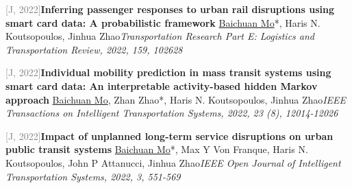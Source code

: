 \par\noindent\begin{minipage}{\linewidth}
{\textcolor{gray}{[J\themyCounter, 2022]\;}}{\textbf{Inferring passenger responses to urban rail disruptions using smart card data: A probabilistic framework} \href{https://doi.org/10.1016/j.tre.2022.102628}{\textcolor{cadmiumorange}{\faExternalLink}}}{\newline \underline{Baichuan Mo}*, Haris N. Koutsopoulos, Jinhua Zhao}{\newline \emph{Transportation Research Part E: Logistics and Transportation Review, 2022, 159, 102628}}{{\;     }}{}
\end{minipage}\par\vspace{5.5pt}


\par\noindent\begin{minipage}{\linewidth}
{\textcolor{gray}{[J\themyCounter, 2022]\;}}{\textbf{Individual mobility prediction in mass transit systems using smart card data: An interpretable activity-based hidden Markov approach} \href{https://doi.org/10.1109/TITS.2021.3109428}{\textcolor{cadmiumorange}{\faExternalLink}}}{\newline \underline{Baichuan Mo}, Zhan Zhao*, Haris N. Koutsopoulos, Jinhua Zhao}{\newline \emph{IEEE Transactions on Intelligent Transportation Systems, 2022, 23 (8), 12014-12026}}{{\;     }}{}
\end{minipage}\par\vspace{5.5pt}


\par\noindent\begin{minipage}{\linewidth}
{\textcolor{gray}{[J\themyCounter, 2022]\;}}{\textbf{Impact of unplanned long-term service disruptions on urban public transit systems} \href{https://doi.org/10.1109/OJITS.2022.3199108}{\textcolor{cadmiumorange}{\faExternalLink}}}{\newline \underline{Baichuan Mo}*, Max Y Von Franque, Haris N. Koutsopoulos, John P Attanucci, Jinhua Zhao}{\newline \emph{IEEE Open Journal of Intelligent Transportation Systems, 2022, 3, 551-569}}{{\;    }}{}
\end{minipage}\par\vspace{5.5pt}


